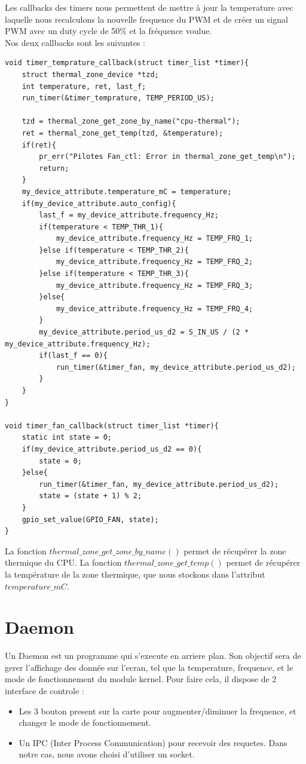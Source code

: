 \documentclass[
	a4paper, %
	10pt, %
]{CSUniSchoolLabReport}
\begin{document}
Les callbacks des timers nous permettent de mettre à jour la temperature avec laquelle nous recalculons la nouvelle frequence du PWM et de créer un signal PWM avec un duty cycle de 50\% et la fréquence voulue. \\
Nos deux callbacks sont les suivantes :
\begin{lstlisting}[style=CStyle]
void timer_temprature_callback(struct timer_list *timer){
	struct thermal_zone_device *tzd;
	int temperature, ret, last_f;
	run_timer(&timer_temprature, TEMP_PERIOD_US);

	tzd = thermal_zone_get_zone_by_name("cpu-thermal");
	ret = thermal_zone_get_temp(tzd, &temperature);
	if(ret){
		pr_err("Pilotes Fan_ctl: Error in thermal_zone_get_temp\n");
		return;
	}
	my_device_attribute.temperature_mC = temperature;
	if(my_device_attribute.auto_config){
		last_f = my_device_attribute.frequency_Hz;
		if(temperature < TEMP_THR_1){
			my_device_attribute.frequency_Hz = TEMP_FRQ_1;
		}else if(temperature < TEMP_THR_2){
			my_device_attribute.frequency_Hz = TEMP_FRQ_2;
		}else if(temperature < TEMP_THR_3){
			my_device_attribute.frequency_Hz = TEMP_FRQ_3;
		}else{
			my_device_attribute.frequency_Hz = TEMP_FRQ_4;
		}
		my_device_attribute.period_us_d2 = S_IN_US / (2 * my_device_attribute.frequency_Hz);
		if(last_f == 0){
			run_timer(&timer_fan, my_device_attribute.period_us_d2);
		}
	}
}

void timer_fan_callback(struct timer_list *timer){
	static int state = 0;
	if(my_device_attribute.period_us_d2 == 0){
		state = 0;
	}else{
		run_timer(&timer_fan, my_device_attribute.period_us_d2);
		state = (state + 1) % 2;
	}
	gpio_set_value(GPIO_FAN, state);
}
\end{lstlisting}

La fonction $thermal\_zone\_get\_zone\_by\_name()$ permet de récupérer la zone thermique du CPU. La fonction $thermal\_zone\_get\_temp()$ permet de récupérer la température de la zone thermique, que nous stockons dans l'attribut $temperature\_mC$. \\

\section{Daemon}\label{Daemon}
Un Daemon est un programme qui s'execute en arriere plan. 
Son objectif sera de gerer l'affichage des donnée sur l'ecran, tel que la temperature, frequence, et le mode de fonctionnement du module kernel.
Pour faire cela, il dispose de 2 interface de controle : \\
\begin{itemize}
	\item Les 3 bouton present sur la carte pour augmenter/diminuer la frequence, et changer le mode de fonctionnement.
	\item Un IPC (Inter Process Communication) pour recevoir des requetes. Dans notre cas, nous avons choisi d'utiliser un socket.
\end{itemize}
\end{document}
